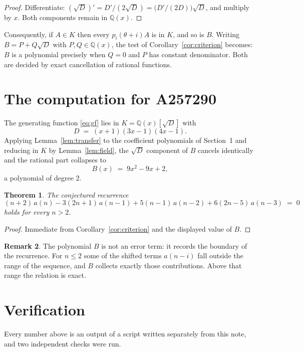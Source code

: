 \documentclass[11pt,a4paper]{article}
\theoremstyle{plain}
\newtheorem{theorem}{Theorem}
\theoremstyle{definition}
\newtheorem{remark}[theorem]{Remark}
\begin{document}
\begin{proof}
Differentiate: $(\sqrt{D})'=D'/(2\sqrt{D})=\bigl(D'/(2D)\bigr)\sqrt{D}$, and multiply by
$x$. Both components remain in $\mathbb{Q}(x)$.
\end{proof}

Consequently, if $A\in K$ then every $p_{i}(\theta+i)A$ is in $K$, and so is $B$. Writing
$B=P+Q\sqrt{D}$ with $P,Q\in\mathbb{Q}(x)$, the test of Corollary~\ref{cor:criterion}
becomes: $B$ is a polynomial precisely when $Q=0$ and $P$ has constant denominator. Both
are decided by exact cancellation of rational functions.

\section{The computation for A257290}

The generating function \eqref{eq:gf} lies in $K=\mathbb{Q}(x)[\sqrt{D}]$ with
\[
D \;=\; \left(x + 1\right) \left(3 x - 1\right) \left(4 x - 1\right) .
\]
Applying Lemma~\ref{lem:transfer} to the coefficient polynomials of Section~1 and reducing
in $K$ by Lemma~\ref{lem:field}, the $\sqrt{D}$ component of $B$ cancels identically and
the rational part collapses to
\[
B(x)\;=\;9 x^{2} - 9 x + 2 ,
\]
a polynomial of degree $2$.

\begin{theorem}
The conjectured recurrence
\[
(n + 2)\,a(n) -  3 \left(2 n + 1\right)\,a(n-1) + 5 \left(n - 1\right)\,a(n-2) + 6 \left(2 n - 5\right)\,a(n-3) \;=\;0
\]
holds for every $n>2$.
\end{theorem}

\begin{proof}
Immediate from Corollary~\ref{cor:criterion} and the displayed value of $B$.
\end{proof}

\begin{remark}
The polynomial $B$ is not an error term: it records the boundary of the recurrence. For
$n\le2$ some of the shifted terms $a(n-i)$ fall outside the range of the sequence,
and $B$ collects exactly those contributions. Above that range the relation is exact.
\end{remark}

\section{Verification}

Every number above is an output of a script written separately from this note, and two
independent checks were run.
\end{document}
